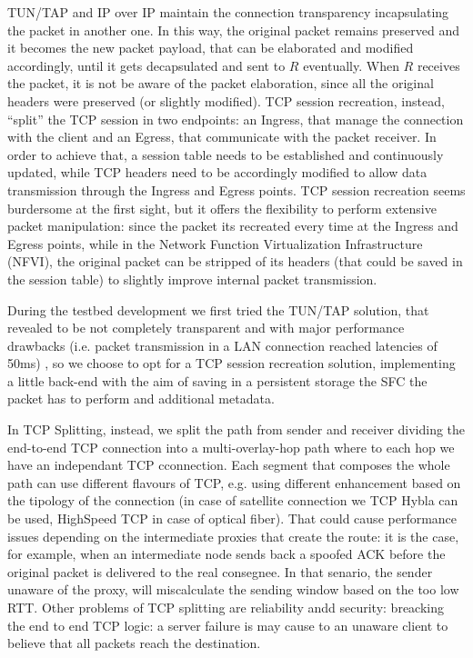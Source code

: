 \documentclass[10pt]{book}
\begin{document}
TUN/TAP and IP over IP maintain the connection transparency incapsulating the 
packet in another one. In this way, the original packet remains preserved and it 
becomes the new packet payload, that can 
be elaborated and modified accordingly, until it gets decapsulated and sent to 
$R$ eventually. When $R$ receives the packet, it is not be aware of the packet 
elaboration, since all the original headers were preserved (or slightly 
modified). TCP session recreation, instead, ``split'' the TCP session in two 
endpoints: an Ingress, that manage the connection with the client and an 
Egress, that communicate with the packet receiver. In order to achieve that, a 
session table needs to be established and continuously updated, while TCP 
headers need to be accordingly modified to allow data transmission through the 
Ingress and Egress points. TCP session recreation seems burdersome at the first 
sight, but it offers the flexibility to perform extensive packet manipulation: 
since the packet its recreated every time at the Ingress and Egress points, 
while in the Network Function Virtualization Infrastructure (NFVI), the 
original packet can be stripped of its headers (that could be saved in the 
session table) to slightly improve internal packet transmission. 

During the testbed development we first tried the TUN/TAP solution, that 
revealed to be not completely transparent and with major performance drawbacks 
(i.e. packet transmission in a LAN connection reached latencies of 50ms) 
, so we choose to opt for a TCP session recreation solution, 
implementing a little back-end with the aim of saving in a persistent storage 
the SFC the packet has to perform and additional metadata.

In TCP Splitting, instead, we split the path from sender and receiver dividing
the end-to-end TCP connection into a multi-overlay-hop path where to each hop
we have an independant TCP cconnection. Each segment that composes the whole
path can use different flavours of TCP, e.g. using different enhancement based
on the tipology of the connection (in case of satellite connection we TCP Hybla
can be used, HighSpeed TCP in case of optical fiber). That could cause
performance issues depending on the intermediate proxies that create the route:
it is the case, for example, when an intermediate node sends back a spoofed ACK
before the original packet is delivered to the real consegnee. In that senario,
the sender unaware of the proxy, will miscalculate the sending window based on
the too low RTT. Other problems of TCP splitting are reliability andd security:
breacking the end to end TCP logic: a server failure is may cause to an unaware
client to believe that all packets reach the destination.
\end{document}
